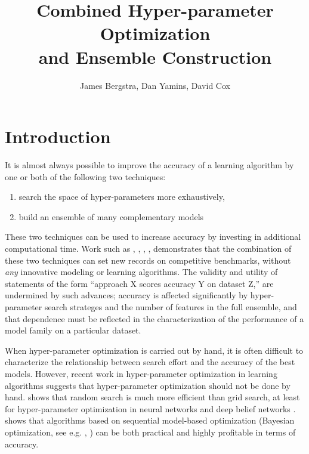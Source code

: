 \documentclass[11pt,twocolumn]{article}
\title{Combined Hyper-parameter Optimization\\and Ensemble Construction}
\author{James Bergstra, Dan Yamins, David Cox}
\begin{document}
\maketitle


\section{Introduction}

It is almost always possible to improve the accuracy of a learning
algorithm by one or both of the following two techniques:
\begin{enumerate}
 \item search the space of hyper-parameters more exhaustively,
 \item build an ensemble of many complementary models
\end{enumerate}

\vspace{11pt}
These two techniques can be used to increase accuracy by investing in
additional computational time.
Work such as
\citet{plos_ht}, \citet{fg11}, \citet{coates+lee+ng:2010},
\citet{gehler}, \citet{bergstra+bardenet+bengio+kegl:2011}
demonstrates that the combination of these two techniques can set new
records on competitive benchmarks, without \emph{any} innovative modeling or
learning algorithms.  The validity and utility of statements of the form
``approach X scores accuracy Y on dataset Z,'' are undermined by such
advances; accuracy is affected significantly by hyper-parameter search
strateges and the number of features in the full ensemble, and that
dependence must be reflected in the characterization of the performance
of a model family on a particular dataset.

\vspace{11pt}
When hyper-parameter optimization is carried out by hand, it is often
difficult to characterize the relationship between search effort and the
accuracy of the best models. However, recent work in hyper-parameter
optimization in learning algorithms suggests that hyper-parameter
optimization should not be done by hand.
\citet{bergstra+bengio:2012} shows that random search is much more
efficient than grid search, at least for hyper-parameter optimization in
neural networks and deep belief networks
\citep{hinton+osinero+teh:2006}.
\citet{bergstra+bardenet+bengio+kegl:2011} shows that algorithms based on
sequential model-based optimization (Bayesian optimization,
see e.g. \citep{hutter:2006}, \citet{brochu:2008})
can be both practical and highly profitable in terms of accuracy.
\end{document}
